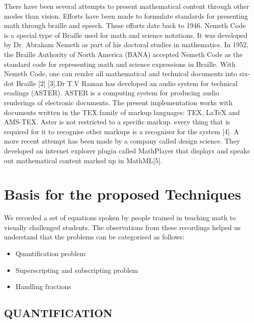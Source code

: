 \documentclass{article}
\begin{document}
There have been several attempts to present mathematical content through other modes than vision. Efforts have been made to formulate standards for presenting math through braille and speech. These efforts date back to 1946. Nemeth Code is a special type of Braille used for math and science notations. It was developed by Dr. Abraham Nemeth as part of his doctoral studies in mathematics. In 1952, the Braille Authority of North America (BANA) accepted Nemeth Code as the standard code for representing math and science expressions in Braille. With Nemeth Code, one can render all mathematical and technical documents into six-dot Braille
[2] [3].Dr T.V Raman has developed an audio system for technical readings (ASTER). ASTER is a computing system for producing audio renderings of electronic documents. The present implementation works with documents written in the TEX family of markup languages: TEX, LaTeX and AMS-TEX.
Aster is not restricted to a specific markup. every thing that is required for it to recognise other markups is a recogniser for the system
[4].
A more recent attempt has been made by a company called design science. They developed an internet explorer plugin called MathPlayer that displays and speaks out mathematical content marked up in MathML[5].




\section{Basis for the proposed Techniques}
\label{sec:pagestyle}

We recorded a set of equations spoken by people trained in teaching math to visually challenged students. The observations from these recordings helped us understand that the problems can be categorised as follows:

   \begin{itemize}

   \item Quantification problem
    
   \item Superscripting and subscripting problem
    
   \item Handling fractions

   \end{itemize}

\subsection{QUANTIFICATION}
\label{ssec:subsubhead}
\end{document}
